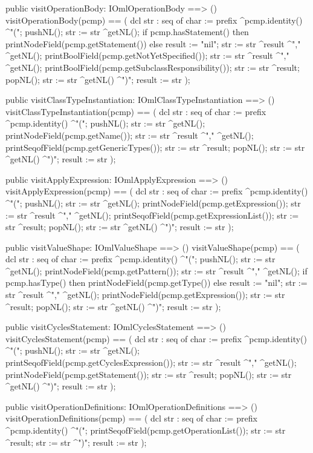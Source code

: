 \begin{vdm_al}
  public visitOperationBody: IOmlOperationBody ==> ()
  visitOperationBody(pcmp) ==
    ( dcl str : seq of char := prefix ^pcmp.identity() ^"(";
      pushNL();
      str := str ^getNL();
      if pcmp.hasStatement()
      then printNodeField(pcmp.getStatement())
      else result := "nil";
      str := str ^result ^"," ^getNL();
      printBoolField(pcmp.getNotYetSpecified());
      str := str ^result ^"," ^getNL();
      printBoolField(pcmp.getSubclassResponsibility());
      str := str ^result;
      popNL();
      str := str ^getNL() ^")";
      result := str );

  public visitClassTypeInstantiation: IOmlClassTypeInstantiation ==> ()
  visitClassTypeInstantiation(pcmp) ==
    ( dcl str : seq of char := prefix ^pcmp.identity() ^"(";
      pushNL();
      str := str ^getNL();
      printNodeField(pcmp.getName());
      str := str ^result ^"," ^getNL();
      printSeqofField(pcmp.getGenericTypes());
      str := str ^result;
      popNL();
      str := str ^getNL() ^")";
      result := str );

  public visitApplyExpression: IOmlApplyExpression ==> ()
  visitApplyExpression(pcmp) ==
    ( dcl str : seq of char := prefix ^pcmp.identity() ^"(";
      pushNL();
      str := str ^getNL();
      printNodeField(pcmp.getExpression());
      str := str ^result ^"," ^getNL();
      printSeqofField(pcmp.getExpressionList());
      str := str ^result;
      popNL();
      str := str ^getNL() ^")";
      result := str );

  public visitValueShape: IOmlValueShape ==> ()
  visitValueShape(pcmp) ==
    ( dcl str : seq of char := prefix ^pcmp.identity() ^"(";
      pushNL();
      str := str ^getNL();
      printNodeField(pcmp.getPattern());
      str := str ^result ^"," ^getNL();
      if pcmp.hasType()
      then printNodeField(pcmp.getType())
      else result := "nil";
      str := str ^result ^"," ^getNL();
      printNodeField(pcmp.getExpression());
      str := str ^result;
      popNL();
      str := str ^getNL() ^")";
      result := str );

  public visitCyclesStatement: IOmlCyclesStatement ==> ()
  visitCyclesStatement(pcmp) ==
    ( dcl str : seq of char := prefix ^pcmp.identity() ^"(";
      pushNL();
      str := str ^getNL();
      printSeqofField(pcmp.getCyclesExpression());
      str := str ^result ^"," ^getNL();
      printNodeField(pcmp.getStatement());
      str := str ^result;
      popNL();
      str := str ^getNL() ^")";
      result := str );

  public visitOperationDefinitions: IOmlOperationDefinitions ==> ()
  visitOperationDefinitions(pcmp) ==
    ( dcl str : seq of char := prefix ^pcmp.identity() ^"(";
      printSeqofField(pcmp.getOperationList());
      str := str ^result;
      str := str ^")";
      result := str );


\end{vdm_al}
